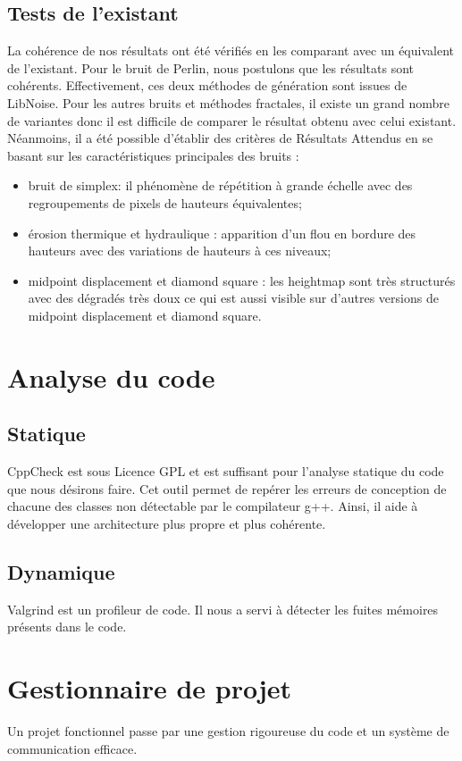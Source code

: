 \subsection{Tests de l'existant}
La cohérence de nos résultats ont été vérifiés en les comparant avec un équivalent de l'existant.
Pour le bruit de Perlin, nous postulons que les résultats sont cohérents. Effectivement,
ces deux méthodes de génération sont issues de LibNoise.
Pour les autres bruits et méthodes fractales, il existe un grand nombre de variantes donc il est difficile
de comparer le résultat obtenu avec celui existant. Néanmoins, il a été possible d'établir des 
critères de Résultats Attendus en se basant sur les caractéristiques principales des bruits :
\begin{itemize}
 \item bruit de simplex: il phénomène de répétition à grande échelle 
 avec des regroupements de pixels de hauteurs équivalentes;
 \item érosion thermique et hydraulique : apparition d'un flou en bordure des hauteurs avec des variations de hauteurs à ces niveaux;
 \item midpoint displacement et diamond square : les heightmap sont très structurés avec des dégradés très doux 
 ce qui est aussi visible sur d'autres versions de midpoint displacement et diamond square.
\end{itemize}

\section{Analyse du code}

\subsection{Statique}
CppCheck est sous Licence GPL et est suffisant pour l'analyse statique du code que nous désirons faire.
Cet outil permet de repérer les erreurs de conception de chacune des classes non détectable par 
le compilateur g++. Ainsi, il aide à développer une architecture plus propre et plus cohérente.

\subsection{Dynamique}
Valgrind est un profileur de code. Il nous a servi à détecter les fuites mémoires présents dans le code.

\section{Gestionnaire de projet}
Un projet fonctionnel passe par une gestion rigoureuse du code et un système de communication efficace.
